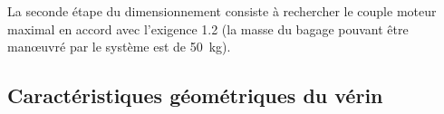 \documentclass[10pt,fleqn]{article} %
\begin{document}
\begin{multicols}{2}
\begin{multicols}{2}
\begin{center}
\begin{obj}
La seconde étape du dimensionnement consiste à rechercher le couple moteur maximal en accord avec
l’exigence 1.2 (la masse du bagage pouvant être manœuvré par le système est de \SI{50}{kg}).
\end{obj}

\end{center}


\vspace{-.5cm}

\subsection*{Caractéristiques géométriques du vérin}
\ifprof
\else

\footnotesize

\begin{multicols}{2}
\end{multicols}
\fi

\normalsize


\ifprof
\end{multicols}
\else
\end{multicols}
\fi
\end{document}
